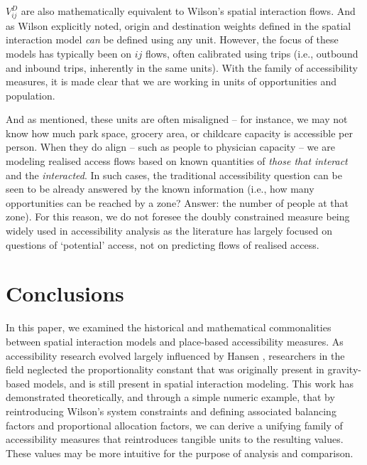 \documentclass[
  10pt,
  letterpaper,
]{article}
\begin{document}
\(V_{ij}^D\) are also mathematically equivalent to Wilson's spatial
interaction flows. And as Wilson \citep{wilson1971} explicitly noted,
origin and destination weights defined in the spatial interaction model
\emph{can} be defined using any unit. However, the focus of these models
has typically been on \(ij\) flows, often calibrated using trips (i.e.,
outbound and inbound trips, inherently in the same units). With the
family of accessibility measures, it is made clear that we are working
in units of opportunities and population.

And as mentioned, these units are often misaligned -- for instance, we
may not know how much park space, grocery area, or childcare capacity is
accessible per person. When they do align -- such as people to physician
capacity -- we are modeling realised access flows based on known
quantities of \emph{those that interact} and the \emph{interacted}. In
such cases, the traditional accessibility question can be seen to be
already answered by the known information (i.e., how many opportunities
can be reached by a zone? Answer: the number of people at that zone).
For this reason, we do not foresee the doubly constrained measure being
widely used in accessibility analysis as the literature has largely
focused on questions of `potential' access, not on predicting flows of
realised access.

\section{Conclusions}\label{conclusions}

In this paper, we examined the historical and mathematical commonalities
between spatial interaction models and place-based accessibility
measures. As accessibility research evolved largely influenced by Hansen
\citep{hansen1959}, researchers in the field neglected the
proportionality constant that was originally present in gravity-based
models, and is still present in spatial interaction modeling. This work
has demonstrated theoretically, and through a simple numeric example,
that by reintroducing Wilson's system constraints and defining
associated balancing factors and proportional allocation factors, we can
derive a unifying family of accessibility measures that reintroduces
tangible units to the resulting values. These values may be more
intuitive for the purpose of analysis and comparison.
\end{document}
